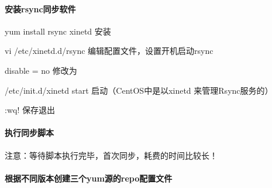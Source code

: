 \documentclass[letterpaper,10pt,english]{sphinxmanual}
\begin{document}
\paragraph{安装rsync同步软件}
\label{\detokenize{software_manage/yum/yum_official_sync:rsync}}
%
\begin{sphinxVerbatim}[commandchars=\\\{\}]
yum install rsync xinetd \PYGZsh{}安装

vi /etc/xinetd.d/rsync \PYGZsh{}编辑配置文件，设置开机启动rsync

disable = no \PYGZsh{}修改为

/etc/init.d/xinetd start \PYGZsh{}启动（CentOS中是以xinetd 来管理Rsync服务的）

:wq! \PYGZsh{}保存退出
\end{sphinxVerbatim}


\paragraph{执行同步脚本}
\label{\detokenize{software_manage/yum/yum_official_sync:id10}}
%
\begin{sphinxVerbatim}[commandchars=\\\{\}]
 
\end{sphinxVerbatim}

注意：等待脚本执行完毕，首次同步，耗费的时间比较长！


\paragraph{根据不同版本创建三个yum源的repo配置文件}
\label{\detokenize{software_manage/yum/yum_official_sync:yumrepo}}
%
\begin{sphinxVerbatim}[commandchars=\\\{\}]
  

  
\end{sphinxVerbatim}
\end{document}
